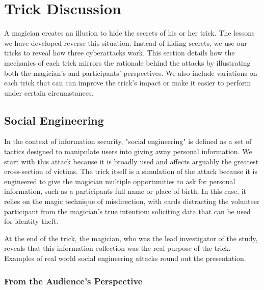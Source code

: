 \section{Trick Discussion}
\label{SEC:background}


A magician creates an illusion to hide the secrets of his or her trick.
The lessons we have developed reverse this situation.
Instead of hiding secrets, we use our tricks to reveal how three cyberattacks
work.  This section details how the mechanics of each trick mirrors the
rationale behind the attacks by illustrating both the magician's and
participants' perspectives.  We also include variations on each trick
that can
can improve the
trick's impact or make it easier to perform under certain circumstances.

\subsection{Social Engineering}

In the context of information security, "social engineering" is defined as a set
of tactics designed to manipulate users into giving away personal information.
We start with this attack because it is broadly used and affects arguably the
greatest cross-section of victims.  The trick itself
is a simulation of the attack because it is engineered to give
the magician multiple opportunities to ask for personal information,
such as a participants full name or place of birth.  In this case,
it relies on the magic technique of misdirection, with cards distracting the
volunteer participant from the magician's true intention: soliciting data that
can be used for identity theft.

At the end of the trick, the magician, who was the lead investigator of the
study, reveals that this information collection was the real purpose of the
trick.  Examples of real world social engineering attacks round out the
presentation.

\subsubsection{From the Audience's Perspective}

